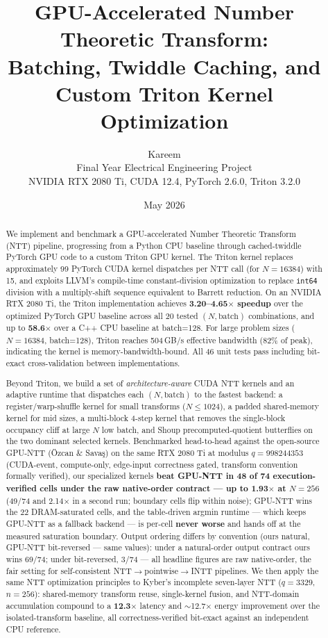 \documentclass[11pt,a4paper]{article}
\title{\textbf{GPU-Accelerated Number Theoretic Transform:}\\
Batching, Twiddle Caching, and Custom Triton Kernel Optimization}
\author{Kareem\\
\small Final Year Electrical Engineering Project\\
\small NVIDIA RTX 2080 Ti, CUDA 12.4, PyTorch 2.6.0, Triton 3.2.0}
\date{May 2026}
\begin{document}
\maketitle

\begin{abstract}
We implement and benchmark a GPU-accelerated Number Theoretic Transform (NTT) pipeline,
progressing from a Python CPU baseline through cached-twiddle PyTorch GPU code to a
custom Triton GPU kernel. The Triton kernel replaces approximately 99 PyTorch CUDA kernel
dispatches per NTT call (for $N=16384$) with 15, and exploits LLVM's compile-time
constant-division optimization to replace \texttt{int64} division with a multiply-shift
sequence equivalent to Barrett reduction. On an NVIDIA RTX 2080 Ti, the Triton
implementation achieves \textbf{3.20--4.65$\times$ speedup} over the optimized PyTorch
GPU baseline across all 20 tested $(N,\text{batch})$ combinations, and up to
\textbf{58.6$\times$} over a C++ CPU baseline at batch=128. For large problem sizes
($N=16384$, batch=128), Triton reaches 504\,GB/s effective bandwidth (82\% of peak),
indicating the kernel is memory-bandwidth-bound. All 46 unit tests pass including
bit-exact cross-validation between implementations.

Beyond Triton, we build a set of \emph{architecture-aware} CUDA NTT kernels and an adaptive
runtime that dispatches each $(N,\text{batch})$ to the fastest backend: a register/warp-shuffle
kernel for small transforms ($N\le1024$), a padded shared-memory kernel for mid sizes, a
multi-block 4-step kernel that removes the single-block occupancy cliff at large $N$ low batch,
and Shoup precomputed-quotient butterflies on the two dominant selected kernels. Benchmarked
head-to-head against the open-source GPU-NTT (Özcan \& Savaş) on the same RTX 2080 Ti at modulus
$q=998244353$ (CUDA-event, compute-only, edge-input correctness gated, transform convention formally
verified), our specialized kernels \textbf{beat GPU-NTT in 48 of 74 execution-verified cells under
the raw native-order contract — up to 1.93$\times$ at $N{=}256$} (49/74 and 2.14$\times$ in a second
run; boundary cells flip within noise); GPU-NTT wins the 22 DRAM-saturated cells, and the table-driven
argmin runtime — which keeps GPU-NTT as a fallback backend — is per-cell \textbf{never worse} and hands
off at the measured saturation boundary. Output ordering differs by convention (ours natural, GPU-NTT
bit-reversed — same values): under a natural-order output contract ours wins 69/74; under bit-reversed,
3/74 — all headline figures are raw native-order, the fair setting for self-consistent
NTT$\to$pointwise$\to$INTT pipelines. We then apply the same
NTT optimization principles to Kyber's incomplete seven-layer NTT ($q=3329$, $n=256$): shared-memory
transform reuse, single-kernel fusion, and NTT-domain accumulation compound to a
\textbf{12.3$\times$} latency and $\sim$12.7$\times$ energy improvement over the isolated-transform
baseline, all correctness-verified bit-exact against an independent CPU reference.
\end{abstract}
\end{document}
